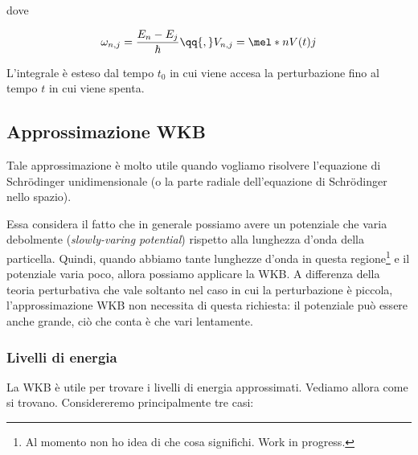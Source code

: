 dove

\begin{equation*}
   \omega_{n,j}=\frac{E_n - E_j}{\hbar}
   \qq{,}
   V_{n,j}=\mel*{n}{V(t)}{j}
\end{equation*}

L'integrale è esteso dal tempo $t_0$ in cui viene accesa la perturbazione fino al tempo $t$ in cui viene spenta.

\subsection*{Approssimazione WKB}

Tale approssimazione è molto utile quando vogliamo risolvere l'equazione di Schrödinger unidimensionale (o la parte radiale dell'equazione di Schrödinger nello spazio).

Essa considera il fatto che in generale possiamo avere un potenziale che varia debolmente (\textit{slowly-varing potential}) rispetto alla lunghezza d'onda della particella. Quindi, quando abbiamo tante lunghezze d'onda in questa regione\footnote{Al momento non ho idea di che cosa significhi. Work in progress.} e il potenziale varia poco, allora possiamo applicare la WKB. A differenza della teoria perturbativa che vale soltanto nel caso in cui la perturbazione è piccola, l'approssimazione WKB non necessita di questa richiesta: il potenziale può essere anche grande, ciò che conta è che vari lentamente.

\subsubsection*{Livelli di energia}
La WKB è utile per trovare i livelli di energia approssimati. Vediamo allora come si trovano. Considereremo principalmente tre casi:

